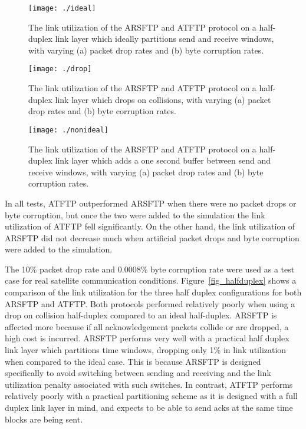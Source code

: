 \documentclass[journal]{./IEEEtran}
\begin{document}
\begin{figure}[!ht]
\begin{center}
\texttt{[image: ./ideal]}
\end{center}
\caption{The link utilization of the ARSFTP and ATFTP protocol on a half-duplex link layer which ideally partitions send and receive windows, with varying (a) packet drop rates and (b) byte corruption rates.}
\label{fig_ideal}
\end{figure}

\begin{figure}[!ht]
\begin{center}
\texttt{[image: ./drop]}
\end{center}
\caption{The link utilization of the ARSFTP and ATFTP protocol on a half-duplex link layer which drops on collisions, with varying (a) packet drop rates and (b) byte corruption rates.}
\label{fig_drop}
\end{figure}

\begin{figure}[!ht]
\begin{center}
\texttt{[image: ./nonideal]}
\end{center}
\caption{The link utilization of the ARSFTP and ATFTP protocol on a half-duplex link layer which adds a one second buffer between send and receive windows, with varying (a) packet drop rates and (b) byte corruption rates.}
\label{fig_nonideal}
\end{figure}

In all tests, ATFTP outperformed ARSFTP when there were no packet drops or byte corruption, but once the two were added to the simulation the link utilization of ATFTP fell significantly. On the other hand, the link utilization of ARSFTP did not decrease much when artificial packet drops and byte corruption were added to the simulation.

The 10\% packet drop rate and 0.0008\% byte corruption rate were used as a test case for real satellite communication conditions.  Figure~\ref{fig_halfduplex} shows a comparison of the link utilization for the three half duplex configurations for both ARSFTP and ATFTP.  Both protocols performed relatively poorly when using a drop on collision half-duplex compared to an ideal half-duplex.  ARSFTP is affected more because if all acknowledgement packets collide or are dropped, a high cost is incurred.  ARSFTP performs very well with a practical half duplex link layer which partitions time windows, dropping only 1\% in link utilization when compared to the ideal case.  This is because ARSFTP is designed specifically to avoid switching between sending and receiving and the link utilization penalty associated with such switches.  In contrast, ATFTP performs relatively poorly with a practical partitioning scheme as it is designed with a full duplex link layer in mind, and expects to be able to send acks at the same time blocks are being sent.
\end{document}
